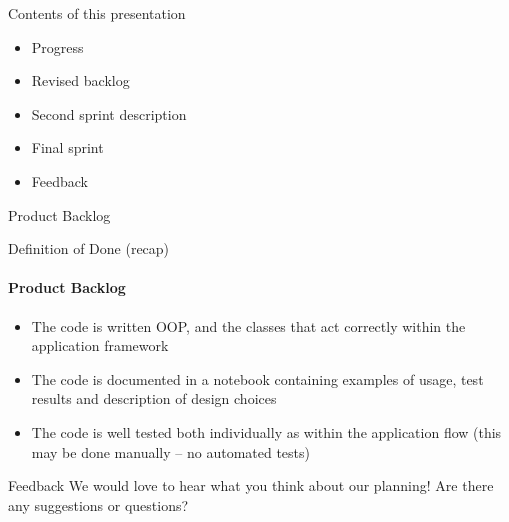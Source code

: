 
\begin{frame}[t,plain]
\titlepage
\end{frame}

\begin{frame}[t]{Contents of this presentation}
\begin{itemize}
	\item Progress
	\item Revised backlog
	\item Second sprint description 
	\item Final sprint 
	\item Feedback
\end{itemize}
\end{frame}



\begin{frame}[t]{Product Backlog}
\end{frame}

\begin{frame}[t]{Definition of Done (recap)}
\framesubtitle{Product Backlog}

\begin{itemize}
	\item  The code is written OOP, and the classes that act correctly within the application framework
	\item The code is documented in a notebook containing examples of usage, test results and description of design choices 
	\item The code is well tested both individually as within the application flow (this may be done manually – no automated tests)
\end{itemize}
\end{frame}



\begin{frame}[t]{Feedback}
We would love to hear what you think about our planning! Are there any suggestions or questions?
\end{frame}
